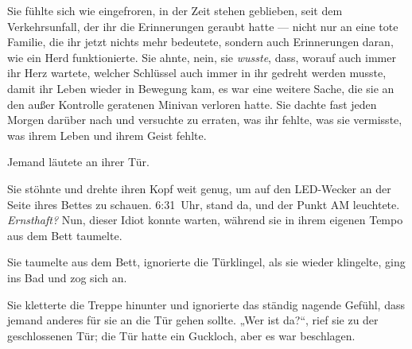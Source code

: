 Sie fühlte sich wie eingefroren, in der Zeit stehen geblieben, seit dem Verkehrsunfall, der ihr die Erinnerungen geraubt hatte — nicht nur an eine tote Familie, die ihr jetzt nichts mehr bedeutete, sondern auch Erinnerungen daran, wie ein Herd funktionierte. Sie ahnte, nein, sie \emph{wusste}, dass, worauf auch immer ihr Herz wartete, welcher Schlüssel auch immer in ihr gedreht werden musste, damit ihr Leben wieder in Bewegung kam, es war eine weitere Sache, die sie an den außer Kontrolle geratenen Minivan verloren hatte. Sie dachte fast jeden Morgen darüber nach und versuchte zu erraten, was ihr fehlte, was sie vermisste, was ihrem Leben und ihrem Geist fehlte.

Jemand läutete an ihrer Tür.

Sie stöhnte und drehte ihren Kopf weit genug, um auf den LED-Wecker an der Seite ihres Bettes zu schauen. 6:31~Uhr, stand da, und der Punkt AM leuchtete. \emph{Ernsthaft?} Nun, dieser Idiot konnte warten, während sie in ihrem eigenen Tempo aus dem Bett taumelte.

Sie taumelte aus dem Bett, ignorierte die Türklingel, als sie wieder klingelte, ging ins Bad und zog sich an.

Sie kletterte die Treppe hinunter und ignorierte das ständig nagende Gefühl, dass jemand anderes für sie an die Tür gehen sollte.
„Wer ist da?“, rief sie zu der geschlossenen Tür; die Tür hatte ein Guckloch, aber es war beschlagen.

